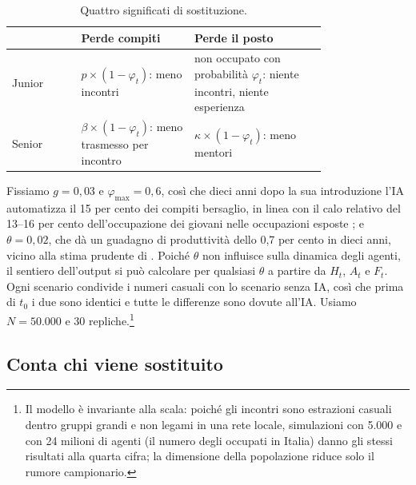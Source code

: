 \documentclass[preprint,12pt,authoryear]{elsarticle}
\begin{document}
\begin{table}[t]\centering\small
\caption{Quattro significati di sostituzione.}\label{tab:margins}
\begin{tabular}{@{}lp{0.36\linewidth}p{0.42\linewidth}@{}}
\toprule
 & Perde compiti & Perde il posto \\
\midrule
Junior & $p\times(1-\varphi_t)$: meno incontri & non occupato con probabilità $\varphi_t$: niente incontri, niente esperienza \\
Senior & $\beta\times(1-\varphi_t)$: meno trasmesso per incontro & $\kappa\times(1-\varphi_t)$: meno mentori \\
\bottomrule
\end{tabular}
\end{table}

Fissiamo $g=0{,}03$ e $\varphi_{\max}=0{,}6$, così che dieci anni dopo la sua introduzione l'IA automatizza il 15 per cento dei compiti bersaglio, in linea con il calo relativo del 13--16 per cento dell'occupazione dei giovani nelle occupazioni esposte \citep{Brynjolfsson2025}; e $\theta=0{,}02$, che dà un guadagno di produttività dello 0,7 per cento in dieci anni, vicino alla stima prudente di \citet{Acemoglu2024}. Poiché $\theta$ non influisce sulla dinamica degli agenti, il sentiero dell'output si può calcolare per qualsiasi $\theta$ a partire da $H_t$, $A_t$ e $F_t$. Ogni scenario condivide i numeri casuali con lo scenario senza IA, così che prima di $t_0$ i due sono identici e tutte le differenze sono dovute all'IA. Usiamo $N=50.000$ e 30 repliche.\footnote{Il modello è invariante alla scala: poiché gli incontri sono estrazioni casuali dentro gruppi grandi e non legami in una rete locale, simulazioni con 5.000 e con 24 milioni di agenti (il numero degli occupati in Italia) danno gli stessi risultati alla quarta cifra; la dimensione della popolazione riduce solo il rumore campionario.}

\subsection{Conta chi viene sostituito}
\end{document}
